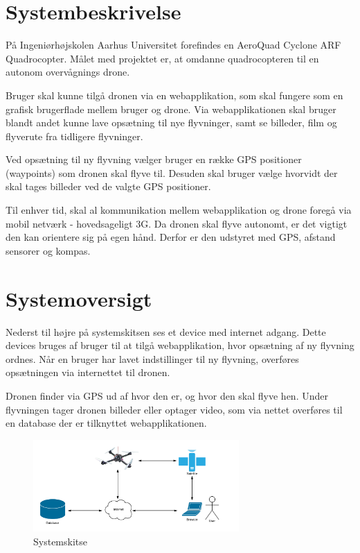 \section{Systembeskrivelse}
På Ingeniørhøjskolen Aarhus Universitet forefindes en AeroQuad Cyclone ARF Quadrocopter. 
Målet med projektet er, at omdanne quadrocopteren til en autonom overvågnings drone.

Bruger skal kunne tilgå dronen via en webapplikation, som skal fungere som en grafisk brugerflade mellem bruger og drone. Via webapplikationen skal bruger blandt andet kunne lave opsætning til nye flyvninger, samt se billeder, film og flyverute fra tidligere flyvninger. 

Ved opsætning til ny flyvning vælger bruger en række GPS positioner (waypoints) som dronen skal flyve til. Desuden skal bruger vælge hvorvidt der skal tages billeder ved de valgte GPS positioner. 

Til enhver tid, skal al kommunikation mellem webapplikation og drone foregå via mobil netværk - hovedsageligt 3G. Da dronen skal flyve autonomt, er det vigtigt den kan orientere sig på egen hånd. Derfor er den udstyret med GPS, afstand sensorer og kompas.


\section{Systemoversigt}
Nederst til højre på systemskitsen ses et device med internet adgang. Dette devices bruges af bruger til at tilgå webapplikation, hvor opsætning af ny flyvning ordnes. Når en bruger har lavet indstillinger til ny flyvning, overføres opsætningen via internettet til dronen.
 
Dronen finder via GPS ud af hvor den er, og hvor den skal flyve hen. Under flyvningen tager dronen billeder eller optager video, som via nettet overføres til en database der er tilknyttet webapplikationen.

\vspace{-5pt}
\begin{figure}[H]
\centering
\includegraphics[width=0.7\textwidth]{Billeder/Projektbeskrivelse.png}
\vspace{-5pt}
\caption{Systemskitse}
\label{fig:Systemskitse}
\end{figure}